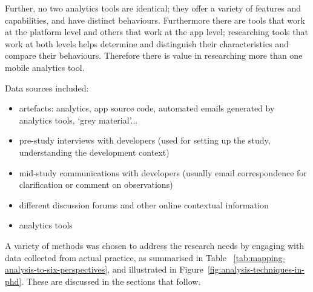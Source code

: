 
Further, no two analytics tools are identical; they offer a variety of features and capabilities, and have distinct behaviours.  Furthermore there are tools that work at the platform level and others that work at the app level; researching tools that work at both levels helps determine and distinguish their characteristics and compare their behaviours. Therefore there is value in researching more than one mobile analytics tool.

Data sources included:
\begin{itemize}
    \item artefacts:  analytics, app source code, automated emails generated by analytics tools, `grey material'...
    \item pre-study interviews with developers (used for setting up the study, understanding the development context)
    \item mid-study communications with developers (usually email correspondence for clarification or comment on observations)
    \item different discussion forums and other online contextual information
    \item analytics tools
\end{itemize}

A variety of methods was chosen to address the research needs by engaging with data collected from actual practice, as summarised in Table ~\ref{tab:mapping-analysis-to-six-perspectives}, and illustrated in Figure~\ref{fig:analysis-techniques-in-phd}. These are discussed in the sections that follow.







